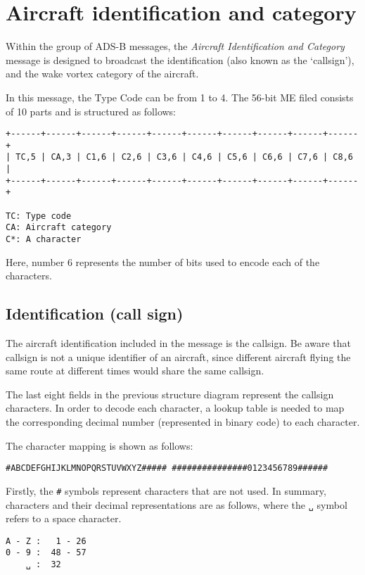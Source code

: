 \chapter{Aircraft identification and category}

Within the group of ADS-B messages, the \emph{Aircraft Identification and Category} message is designed to broadcast the identification (also known as the `callsign'), and the wake vortex category of the aircraft.

In this message, the Type Code can be from 1 to 4. The 56-bit ME filed consists of 10 parts and is structured as follows:

\begin{verbatim}
+------+------+------+------+------+------+------+------+------+------+
| TC,5 | CA,3 | C1,6 | C2,6 | C3,6 | C4,6 | C5,6 | C6,6 | C7,6 | C8,6 |
+------+------+------+------+------+------+------+------+------+------+

TC: Type code
CA: Aircraft category
C*: A character
\end{verbatim}

Here, number 6 represents the number of bits used to encode each of the characters.

\section{Identification (call sign)}
The aircraft identification included in the message is the callsign. Be aware that callsign is not a unique identifier of an aircraft, since different aircraft flying the same route at different times would share the same callsign.

The last eight fields in the previous structure diagram represent the callsign characters. In order to decode each character, a lookup table is needed to map the corresponding decimal number (represented in binary code) to each character.

The character mapping is shown as follows:

\begin{verbatim}
#ABCDEFGHIJKLMNOPQRSTUVWXYZ##### ###############0123456789######
\end{verbatim}

Firstly, the \texttt{\#} symbols represent characters that are not used. In summary, characters and their decimal representations are as follows, where the \texttt{␣} symbol refers to a space character. 

\begin{verbatim}
A - Z :   1 - 26
0 - 9 :  48 - 57
    ␣ :  32
\end{verbatim}


